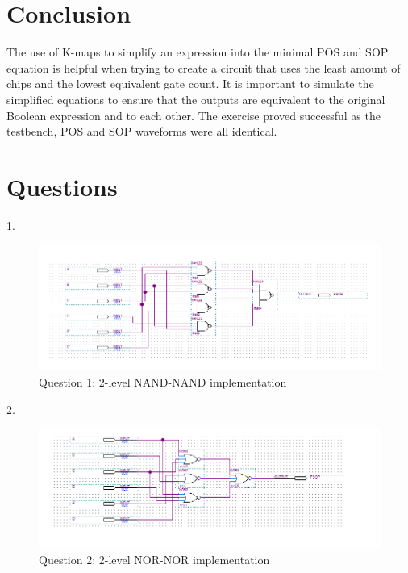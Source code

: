 \documentclass[CMPE]{KGCOEReport}
\begin{document}
\section*{Conclusion}

The use of K-maps to simplify an expression into the minimal POS and SOP equation is helpful when trying to create a circuit that uses the least amount of chips and the lowest equivalent gate count. It is important to simulate the simplified equations to ensure that the outputs are equivalent to the original Boolean expression and to each other. The exercise proved successful as the testbench, POS and SOP waveforms were all identical.

\section*{Questions}
1.
\begin{figure}[H]
	\centering
	\includegraphics[width=1.00\textwidth]{QuartusL5Q1}
	\caption{Question 1: 2-level NAND-NAND implementation}
	\label{fig:Figure 5}
\end{figure}

2.
\begin{figure}[H]
	\centering
	\includegraphics[width=1.10\textwidth]{QuartusL5Q2}
	\caption{Question 2: 2-level NOR-NOR implementation}
	\label{fig:Figure 6}
\end{figure}
\end{document}
